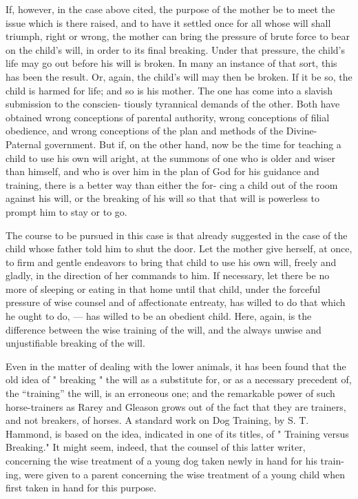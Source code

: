 \documentclass[
]{book}
\begin{document}
If, however, in the case above cited, the purpose of the mother be to meet the issue which is there raised, and to have it settled once for all whose will shall triumph, right or wrong, the mother can bring the pressure of brute force to bear on the child's will, in order to its final breaking. Under that pressure, the child's life may go out before his will is broken. In many an instance of that sort, this has been the result. Or, again, the child's will may then be broken. If it be so, the child is harmed for life; and so is his mother. The one has come into a slavish submission to the conscien- tiously tyrannical demands of the other. Both have obtained wrong conceptions of parental authority, wrong conceptions of filial obedience, and wrong conceptions of the plan and methods of the Divine-Paternal government. But if, on the other hand, now be the time for teaching a child to use his own will aright, at the summons of one who is older and wiser than himself, and who is over him in the plan of God for his guidance and training, there is a better way than either the for- cing a child out of the room against his will, or the breaking of his will so that that will is powerless to prompt him to stay or to go.

The course to be pursued in this case is that already suggested in the case of the child whose father told him to shut the door. Let the mother give herself, at once, to firm and gentle endeavors to bring that child to use his own will, freely and gladly, in the direction of her commands to him. If necessary, let there be no more of sleeping or eating in that home until that child, under the forceful pressure of wise counsel and of affectionate entreaty, has willed to do that which he ought to do, --- has willed to be an obedient child. Here, again, is the difference between the wise training of the will, and the always unwise and unjustifiable breaking of the will.

Even in the matter of dealing with the lower animals, it has been found that the old idea of " breaking " the will as a substitute for, or as a necessary precedent of, the ``training'' the will, is an erroneous one; and the remarkable power of such horse-trainers as Rarey and Gleason grows out of the fact that they are trainers, and not breakers, of horses. A standard work on Dog Training, by S. T. Hammond, is based on the idea, indicated in one of its titles, of " Training versus Breaking." It might seem, indeed, that the counsel of this latter writer, concerning the wise treatment of a young dog taken newly in hand for his train- ing, were given to a parent concerning the wise treatment of a young child when first taken in hand for this purpose.
\end{document}
